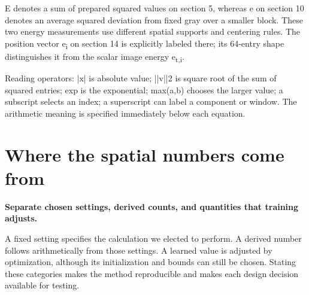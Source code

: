 \documentclass[11pt,letterpaper]{article}
\begin{document}
E denotes a sum of prepared squared values on section 5, whereas e on section 10 denotes an average squared deviation from fixed gray over a smaller block. These two energy measurements use different spatial supports and centering rules. The position vector e\textsubscript{i} on section 14 is explicitly labeled there; its 64-entry shape distinguishes it from the scalar image energy e\textsubscript{t,i}.


{
\small\color{muted} Reading operators: |x| is absolute value; ||v||2 is square root of the sum of squared entries; exp is the exponential; max(a,b) chooses the larger value; a subscript selects an index; a superscript can label a component or window. The arithmetic meaning is specified immediately below each equation.\par}


\clearpage

\section{Where the spatial numbers come from}\label{sec19}

\textbf{Separate chosen settings, derived counts, and quantities that training adjusts.}


A fixed setting specifies the calculation we elected to perform. A derived number follows arithmetically from those settings. A learned value is adjusted by optimization, although its initialization and bounds can still be chosen. Stating these categories makes the method reproducible and makes each design decision available for testing.
\end{document}
